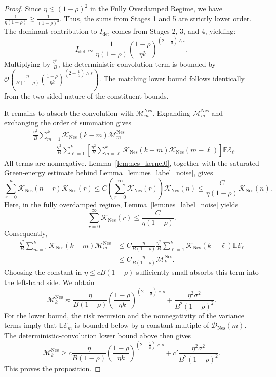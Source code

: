 \begin{proof}
Since $\eta \lesssim (1-\rho)^2$ in the Fully Overdamped Regime, we have $\frac{1}{\eta(1-\rho)} \gtrsim \frac{1}{(1-\rho)^3}$. Thus, the sums from Stages 1 and 5 are strictly lower order. The dominant contribution to $I_{\mathrm{det}}$ comes from Stages 2, 3, and 4, yielding:
\[
    I_{\mathrm{det}} \eqsim \frac{1}{\eta(1-\rho)} \left(\frac{1-\rho}{\eta k}\right)^{\left(2-\frac1\beta\right)\wedge s}.
\]
Multiplying by $\frac{\eta^2}{B}$, the deterministic convolution term is bounded by $\mathcal{O}\left( \frac{\eta}{B(1-\rho)} \left(\frac{1-\rho}{\eta k}\right)^{\left(2-\frac1\beta\right)\wedge s} \right)$. The matching lower bound follows identically from the two-sided nature of the constituent bounds.

It remains to absorb the convolution with \(\mathcal M_m^{\mathrm{Nes}}\).  Expanding \(\mathcal M_m^{\mathrm{Nes}}\) and exchanging the order of summation gives
\[
\begin{aligned}
    &\frac{\eta^2}{B}
    \sum_{m=1}^{k}
    \mathcal K_{\mathrm{Nes}}(k-m)
    \mathcal M_m^{\mathrm{Nes}} \\
    &\qquad=
    \frac{\eta^2}{B}
    \sum_{\ell=1}^{k}
    \left[
        \frac{\eta^2}{B}
        \sum_{m=\ell}^{k}
        \mathcal K_{\mathrm{Nes}}(k-m)
        \mathcal K_{\mathrm{Nes}}(m-\ell)
    \right]
    \mathbb{E}\mathcal E_\ell.
\end{aligned}
\]
All terms are nonnegative.  Lemma~\ref{lem:nes_kernel0}, together with the saturated Green-energy estimate behind Lemma~\ref{lem:nes_label_noise}, gives
\[
    \sum_{r=0}^{n}
    \mathcal K_{\mathrm{Nes}}(n-r)
    \mathcal K_{\mathrm{Nes}}(r)
    \le
    C\left(\sum_{r=0}^{\infty}\mathcal K_{\mathrm{Nes}}(r)\right)
    \mathcal K_{\mathrm{Nes}}(n)
    \le
    \frac{C}{\eta(1-\rho)}
    \mathcal K_{\mathrm{Nes}}(n).
\]
Here, in the fully overdamped regime, Lemma~\ref{lem:nes_label_noise} yields
\[
    \sum_{r=0}^{\infty}\mathcal K_{\mathrm{Nes}}(r)
    \le
    \frac{C}{\eta(1-\rho)}.
\]
Consequently,
\[
\begin{aligned}
    \frac{\eta^2}{B}
    \sum_{m=1}^{k}
    \mathcal K_{\mathrm{Nes}}(k-m)
    \mathcal M_m^{\mathrm{Nes}}
    &\le
    C\frac{\eta}{B(1-\rho)}
    \frac{\eta^2}{B}
    \sum_{\ell=1}^{k}
    \mathcal K_{\mathrm{Nes}}(k-\ell)
    \mathbb{E}\mathcal E_\ell \\
    &\le
    C\frac{\eta}{B(1-\rho)}
    \mathcal M_k^{\mathrm{Nes}}.
\end{aligned}
\]
Choosing the constant in \(\eta\le cB(1-\rho)\) sufficiently small absorbs this term into the left-hand side.  We obtain
\[
    \mathcal M_k^{\mathrm{Nes}}
    \eqsim
    \frac{\eta}{B(1-\rho)}
    \left(\frac{1-\rho}{\eta k}\right)^{(2-\frac1\beta)\wedge s} + \frac{\eta^2\sigma^2}{B^2(1-\rho)^2}.
\]
For the lower bound, the risk recursion and the nonnegativity of the variance terms imply that \(\mathbb{E}\mathcal E_m\) is bounded below by a constant multiple of \(\mathcal D_{\mathrm{Nes}}(m)\).  The deterministic-convolution lower bound above then gives
\[
    \mathcal M_k^{\mathrm{Nes}}
    \ge
    c\frac{\eta}{B(1-\rho)}
    \left(\frac{1-\rho}{\eta k}\right)^{(2-\frac1\beta)\wedge s} + c'\frac{\eta^2\sigma^2}{B^2(1-\rho)^2}.
\]
This proves the proposition.
\end{proof}


